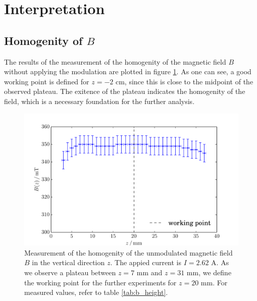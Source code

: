 \section{Interpretation}

\subsection{Homogenity of $B$}
The results of the measurement of the homogenity of the magnetic field $B$ 
without applying the modulation are plotted in figure 
\ref{fig:b_height}. As one can see, a good working point is defined for $z = -2$ cm, since 
this is close to the midpoint of the observed plateau. The exitence of the plateau indicates the homogenity 
of the field, which is a necessary foundation for the further analysis.
\begin{figure}
\includegraphics[width=\textwidth]{figures/b_height.pdf}
\caption{   
    Measurement of the homogenity of the unmodulated magnetic field $B$ in the vertical direction $z$. 
    The appied current is $I = 2.62$ A. As we observe a plateau between $z = 7$ mm and $z = 31$ mm, 
    we define the working point for the further experiments for $z = 20$ mm.
    For measured values, refer to table \ref{tab:b_height}.
    }
\label{fig:b_height}
\end{figure}
\FloatBarrier

